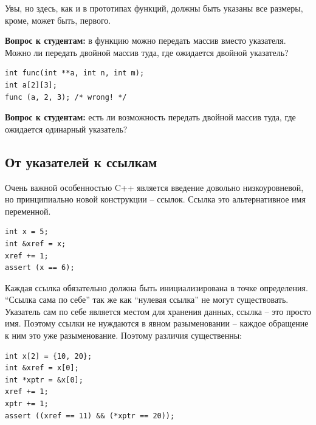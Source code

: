 \documentclass[a4paper,12pt,oneside]{article}
\newif\ifanswers
\begin{document}
Увы, но здесь, как и в прототипах функций, должны быть указаны все размеры, кроме, может быть, первого.

\textbf{Вопрос к студентам:} в функцию можно передать массив вместо указателя. Можно ли передать двойной массив туда, где ожидается двойной указатель?

\begin{lstlisting}
int func(int **a, int n, int m);
int a[2][3];
func (a, 2, 3); /* wrong! */
\end{lstlisting}

\ifanswers
Но это не работает. Двумерный массив уже не может деградировать к указателю на указатель, а только к указателю на массив (из рисунка \ref{fig:c_arrays} причины должны быть уже очевидны). 
\fi

\textbf{Вопрос к студентам:} есть ли возможность передать двойной массив туда, где ожидается одинарный указатель?

\ifanswers
Ответ: да, есть забавный трюк.

\begin{lstlisting}
int func(int *a, int n, int m);
int a[2][3];
func (&a[0][0], 2, 3); /* ok */
\end{lstlisting}

Но внутри функции это потребует ручного обслуживания такого ``развернутого'' массива.
\fi

\pagebreak
\subsection{От указателей к ссылкам}\label{PointersAndRefs}

Очень важной особенностью C++ является введение довольно низкоуровневой, но принципиально новой конструкции – ссылок. Ссылка это альтернативное имя переменной.

\begin{lstlisting}
int x = 5;
int &xref = x;
xref += 1;
assert (x == 6);
\end{lstlisting}

Каждая ссылка обязательно должна быть инициализирована в точке определения. ``Ссылка сама по себе'' так же как ``нулевая ссылка'' не могут существовать. Указатель сам по себе является местом для хранения данных, ссылка – это просто имя. Поэтому ссылки не нуждаются в явном разыменовании – каждое обращение к ним это уже разыменование. Поэтому различия существенны:

\begin{lstlisting}
int x[2] = {10, 20};
int &xref = x[0];
int *xptr = &x[0];
xref += 1;
xptr += 1;
assert ((xref == 11) && (*xptr == 20));
\end{lstlisting}
\end{document}
